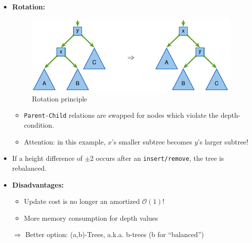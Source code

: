 \documentclass[12pt, a4paper]{scrartcl}
\newcommand{\bigO}{\mathcal{O}}
\renewcommand{\implies}{\Rightarrow}
\newcommand{\imgwidth}{.7\textwidth}
\begin{document}
\begin{itemize}
\begin{figure}[htbp]
\begin{subfigure}[b]{0.25\textwidth}
    \caption{Not an AVL tree}
  \end{subfigure}
\end{figure}\newpage
\item \textbf{Rotation:}
  \begin{figure}[!htbp]
    \centering
    \includegraphics[width=\imgwidth]{rotation}
    \caption{Rotation principle}
    \label{fig:rotation}
  \end{figure}

  \begin{itemize}
  \item \texttt{Parent-Child} relations are swapped for nodes which violate the depth-condition.
  \item Attention: in this example, $x$'s smaller subtree becomes $y$'s larger subtree!
  \end{itemize}
\item If a height difference of $\pm2$ occurs after an \texttt{insert/remove}, the tree is rebalanced.
\item \textbf{Disadvantages:}
  \begin{itemize}
  \item Update cost is no longer an amortized $\bigO(1)$!
  \item More memory consumption for depth values
  \end{itemize}
\item[$\implies$] Better option: (a,b)-Trees, a.k.a. b-trees (b for ``balanced'')
\end{itemize}
\end{document}
